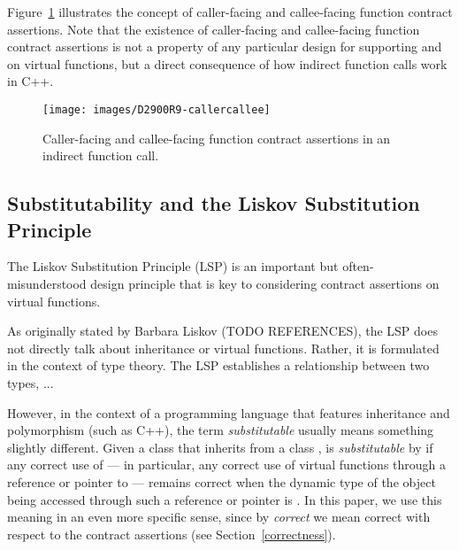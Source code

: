 Figure~\ref{fig_callercallee} illustrates the concept of caller-facing and callee-facing function contract assertions. Note that the existence of caller-facing and callee-facing function contract assertions is not a property of any particular design for supporting  and  on virtual functions, but a direct consequence of how indirect function calls work in C++.

\begin{figure}[b]
\begin{center}
\texttt{[image: images/D2900R9-callercallee]}
\end{center}
\caption{Caller-facing and callee-facing function contract assertions in an indirect function call.}
\label{fig_callercallee}
\end{figure}

\subsection{Substitutability and the Liskov Substitution Principle}

The Liskov Substitution Principle (LSP) is an important but often-misunderstood design principle that is key to considering contract assertions on virtual functions. 

As originally stated by Barbara Liskov (TODO REFERENCES), the LSP does not directly talk about inheritance or virtual functions. Rather, it is formulated in the context of type theory. The LSP establishes a relationship between two types, ...

However, in the context of a programming language that features inheritance and polymorphism (such as C++), the term \emph{substitutable} usually means something slightly different. Given a class  that inherits from a class ,  is \emph{substitutable} by  if any correct use of  --- in particular, any correct use of virtual functions through a reference or pointer to  --- remains correct when the dynamic type of the object being accessed through such a reference or pointer is . In this paper, we use this meaning in an even more specific sense, since by \emph{correct} we mean correct with respect to the contract assertions (see Section~\ref{correctness}). 

